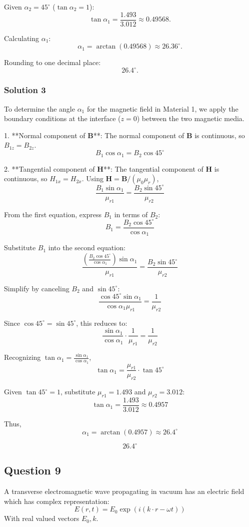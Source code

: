 \documentclass{article}
\begin{document}
Given \(\alpha_2 = 45^\circ\) (\(\tan\alpha_2 = 1\)):
\[
\tan\alpha_1 = \frac{1.493}{3.012} \approx 0.49568.
\]

Calculating \(\alpha_1\):
\[
\alpha_1 = \arctan(0.49568) \approx 26.36^\circ.
\]

Rounding to one decimal place:
\[
\boxed{26.4^\circ}.
\]

\subsubsection{Solution 3}
To determine the angle \(\alpha_1\) for the magnetic field in Material 1, we apply the boundary conditions at the interface (\(z = 0\)) between the two magnetic media. 

1. **Normal component of \(\mathbf{B}\)**:  
   The normal component of \(\mathbf{B}\) is continuous, so \(B_{1z} = B_{2z}\).  
   \[
   B_1 \cos \alpha_1 = B_2 \cos 45^\circ
   \]

2. **Tangential component of \(\mathbf{H}\)**:  
   The tangential component of \(\mathbf{H}\) is continuous, so \(H_{1x} = H_{2x}\). Using \(\mathbf{H} = \mathbf{B}/(\mu_0 \mu_r)\),  
   \[
   \frac{B_1 \sin \alpha_1}{\mu_{r1}} = \frac{B_2 \sin 45^\circ}{\mu_{r2}}
   \]

From the first equation, express \(B_1\) in terms of \(B_2\):  
\[
B_1 = \frac{B_2 \cos 45^\circ}{\cos \alpha_1}
\]

Substitute \(B_1\) into the second equation:  
\[
\frac{\left(\frac{B_2 \cos 45^\circ}{\cos \alpha_1}\right) \sin \alpha_1}{\mu_{r1}} = \frac{B_2 \sin 45^\circ}{\mu_{r2}}
\]

Simplify by canceling \(B_2\) and \(\sin 45^\circ\):  
\[
\frac{\cos 45^\circ \sin \alpha_1}{\cos \alpha_1 \mu_{r1}} = \frac{1}{\mu_{r2}}
\]

Since \(\cos 45^\circ = \sin 45^\circ\), this reduces to:  
\[
\frac{\sin \alpha_1}{\cos \alpha_1} \cdot \frac{1}{\mu_{r1}} = \frac{1}{\mu_{r2}}
\]

Recognizing \(\tan \alpha_1 = \frac{\sin \alpha_1}{\cos \alpha_1}\),  
\[
\tan \alpha_1 = \frac{\mu_{r1}}{\mu_{r2}} \cdot \tan 45^\circ
\]

Given \(\tan 45^\circ = 1\), substitute \(\mu_{r1} = 1.493\) and \(\mu_{r2} = 3.012\):  
\[
\tan \alpha_1 = \frac{1.493}{3.012} \approx 0.4957
\]

Thus,  
\[
\alpha_1 = \arctan(0.4957) \approx 26.4^\circ
\]

\[
\boxed{26.4^\circ}
\]

\subsection{Question 9}
A transverse electromagnetic wave propagating in vacuum has an electric field which has complex representation:
\[
E(r, t) = E_0 \exp(i (k \cdot r - \omega t))
\]
With real valued vectors \(E_0, k\).
\end{document}
